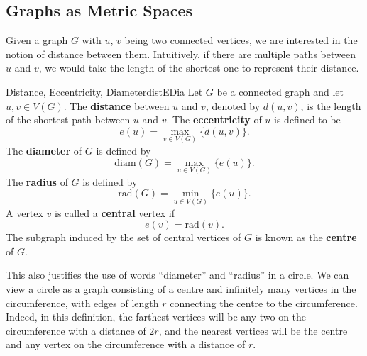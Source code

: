 \documentclass[math, code]{amznotes}
\theoremstyle{remark}
\begin{document}
\subsection{Graphs as Metric Spaces}
Given a graph $G$ with $u$, $v$ being two connected vertices, we are interested in the notion of distance between them. Intuitively, if there are multiple paths between $u$ and $v$, we would take the length of the shortest one to represent their distance.
\begin{dfnbox}{Distance, Eccentricity, Diameter}{distEDia}
    Let $G$ be a connected graph and let $u, v \in V(G)$. The {\color{red} \textbf{distance}} between $u$ and $v$, denoted by $d(u, v)$, is the length of the shortest path between $u$ and $v$. The {\color{red} \textbf{eccentricity}} of $u$ is defined to be
    \begin{equation*}
        e(u) = \max_{v \in V(G)}\{d(u, v)\}.
    \end{equation*}
    The {\color{red} \textbf{diameter}} of $G$ is defined by
    \begin{equation*}
        \mathrm{diam}(G) = \max_{u \in V(G)}\{e(u)\}.
    \end{equation*}
    The {\color{red} \textbf{radius}} of $G$ is defined by
    \begin{equation*}
        \mathrm{rad}(G) = \min_{u \in V(G)}\{e(u)\}.
    \end{equation*}
    A vertex $v$ is called a {\color{red} \textbf{central}} vertex if
    \begin{equation*}
        e(v) = \mathrm{rad}(v).
    \end{equation*}
    The subgraph induced by the set of central vertices of $G$ is known as the {\color{red} \textbf{centre}} of $G$.
\end{dfnbox}
This also justifies the use of words ``diameter'' and ``radius'' in a circle. We can view a circle as a graph consisting of a centre and infinitely many vertices in the circumference, with edges of length $r$ connecting the centre to the circumference. Indeed, in this definition, the farthest vertices will be any two on the circumference with a distance of $2r$, and the nearest vertices will be the centre and any vertex on the circumference with a distance of $r$.
\end{document}
